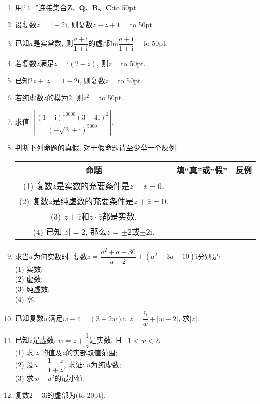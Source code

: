 \documentclass[10pt,a4paper]{article}
\newcommand{\blank}[1]{\underline{\hbox to #1pt{}}}
\newcommand{\bracket}[1]{(\hbox to #1pt{})}
\begin{document}
\begin{enumerate}[1.]
\item 用``$\subseteq$''连接集合$\mathbf{Z}$、$\mathbf{Q}$、$\mathbf{R}$、$\mathbf{C}$:\blank{50}.
\item 设复数$z=1-2\mathrm{i}$, 则复数$z-\overline{z+1}=$\blank{50}.
\item 已知$a$是实常数, 则$\dfrac{a+\mathrm{i}}{1+\mathrm{i}}$的虚部$\mathrm{Im}\dfrac{a+\mathrm{i}}{1+\mathrm{i}}=$\blank{50}.
\item 若复数$z$满足$z=\mathrm{i}(2-z)$, 则$z=$\blank{50}.
\item 已知$2z+|z|=1-2\mathrm{i}$, 则复数$z=$\blank{50}.
\item 若纯虚数$z$的模为$2$, 则$z^2=$\blank{50}.
\item 求值: $|\dfrac{(1-\mathrm{i})^{10000}(3-4\mathrm{i})^2}{(-\sqrt{3}+\mathrm{i})^{5000}}|$.
\item 判断下列命题的真假, 对于假命题请至少举一个反例.
\begin{center}
    \begin{tabular}{|c|c|p{}<{\centering}|}
        \hline
        命题 & 填``真''或``假'' & 反例\\ \hline
        (1) 复数$z$是实数的充要条件是$z-\overline z=0$.	& & \\ \hline
        (2) 复数$z$是纯虚数的充要条件是$z+\overline z=0$. & & \\ \hline
        (3) $z+\overline{z}$和$z\cdot \overline{z}$都是实数. & & \\ \hline
        (4) 已知$|z|=2$, 那么$z=\pm 2$或$\pm 2\mathrm{i}$. & & \\ \hline
    \end{tabular}
\end{center}
\item 求当$a$为何实数时, 复数$z=\dfrac{a^2+a-30}{a+2}+(a^2-3a-10)\mathrm{i}$分别是:\\
(1) 实数;\\
(2) 虚数;\\
(3) 纯虚数;\\
(4) 零.
\item 已知复数$w$满足$w-4=(3-2w)\mathrm{i}$, $z=\dfrac 5w+|w-2|$, 求$|z|$.
\item 已知$z$是虚数, $w=z+\dfrac{1}{z}$是实数, 且$-1<w<2$.\\
(1) 求$|z|$的值及$z$的实部取值范围;\\
(2) 设$u=\dfrac{1-z}{1+z}$, 求证: $u$为纯虚数;\\
(3) 求$w-u^2$的最小值.
\item 复数$2-3\mathrm{i}$的虚部为\bracket{20}.

\end{enumerate}
\end{document}
